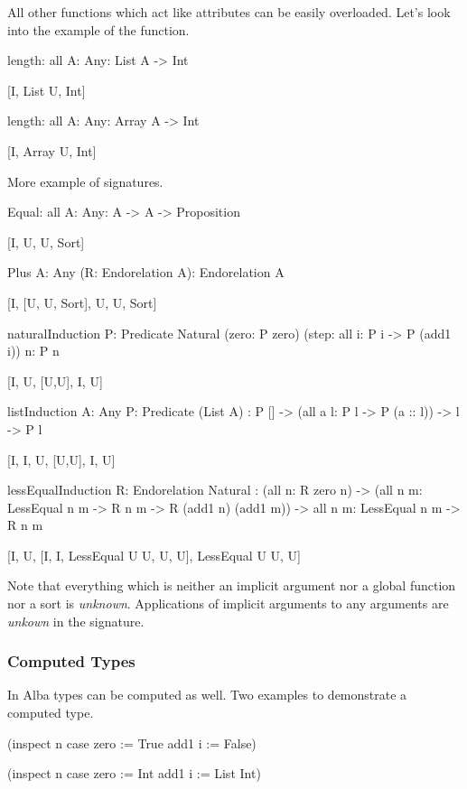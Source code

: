 All other functions which act like attributes can be easily overloaded. Let's
look into the example of the  function.

\begin{alba}
    length: all {A: Any}: List A -> Int

        [I, List U, Int]


    length: all {A: Any}: Array A -> Int

        [I, Array U, Int]
\end{alba}

More example of signatures.
%
\begin{alba}

    Equal: all {A: Any}: A -> A -> Proposition

        [I, U, U, Sort]


    Plus {A: Any} (R: Endorelation A): Endorelation A

        [I, [U, U, Sort], U, U, Sort]


    naturalInduction
        {P: Predicate Natural}
        (zero: P zero) (step: all {i}: P i -> P (add1 i))
        {n}: P n

        [I, U, [U,U], I, U]


    listInduction
        {A: Any} {P: Predicate (List A)}
        : P [] -> (all {a l}: P l -> P (a :: l)) -> {l} -> P l

        [I, I, U, [U,U], I, U]


    lessEqualInduction {R: Endorelation Natural}
        :   (all {n}: R zero n)
            -> (all {n m}: LessEqual n m -> R n m -> R (add1 n) (add1 m))
            -> all {n m}: LessEqual n m -> R n m

        [I, U, [I, I, LessEqual U U, U, U], LessEqual U U, U]
\end{alba}

Note that everything which is neither an implicit argument nor a global function
nor a sort is \emph{unknown}. Applications of implicit arguments to any
arguments are \emph{unkown} in the signature.





\subsubsection{Computed Types}

In Alba types can be computed as well. Two examples to demonstrate a computed
type.
%
\begin{alba}
    (inspect n case
        zero := True
        add1 i := False)

    (inspect n case
        zero := Int
        add1 i := List Int)
\end{alba}
%

